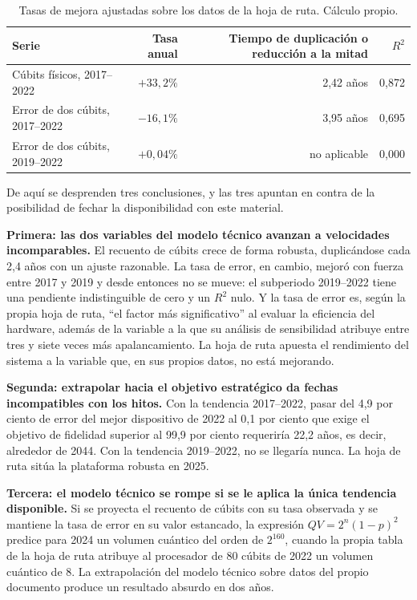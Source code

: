 \documentclass[11pt,letterpaper]{article}
\begin{document}
\begin{table}[ht]
  \centering
  \small
  \caption{Tasas de mejora ajustadas sobre los datos de la hoja de ruta.
  Cálculo propio.}
  \label{tab:tasas}
  \begin{tabularx}{\textwidth}{@{}>{\raggedright\arraybackslash}X rrr@{}}
    \toprule
    \textbf{Serie} & \textbf{Tasa anual} & \textbf{Tiempo de duplicación
    o reducción a la mitad} & \textbf{$R^{2}$} \\
    \midrule
    Cúbits físicos, 2017--2022 & $+33{,}2\%$ & 2,42 años & 0,872 \\
    Error de dos cúbits, 2017--2022 & $-16{,}1\%$ & 3,95 años & 0,695 \\
    Error de dos cúbits, 2019--2022 & $+0{,}04\%$ & no aplicable & 0,000 \\
    \bottomrule
  \end{tabularx}
\end{table}

De aquí se desprenden tres conclusiones, y las tres apuntan en contra de la
posibilidad de fechar la disponibilidad con este material.

\textbf{Primera: las dos variables del modelo técnico avanzan a velocidades
incomparables.} El recuento de cúbits crece de forma robusta, duplicándose cada
2,4 años con un ajuste razonable. La tasa de error, en cambio, mejoró con
fuerza entre 2017 y 2019 y desde entonces no se mueve: el subperiodo 2019--2022
tiene una pendiente indistinguible de cero y un $R^{2}$ nulo. Y la tasa de
error es, según la propia hoja de ruta, \enquote{el factor más significativo}
al evaluar la eficiencia del hardware, además de la variable a la que su
análisis de sensibilidad atribuye entre tres y siete veces más apalancamiento.
La hoja de ruta apuesta el rendimiento del sistema a la variable que, en sus
propios datos, no está mejorando.

\textbf{Segunda: extrapolar hacia el objetivo estratégico da fechas
incompatibles con los hitos.} Con la tendencia 2017--2022, pasar del 4,9 por
ciento de error del mejor dispositivo de 2022 al 0,1 por ciento que exige el
objetivo de fidelidad superior al 99,9 por ciento requeriría 22,2 años, es
decir, alrededor de 2044. Con la tendencia 2019--2022, no se llegaría nunca. La
hoja de ruta sitúa la plataforma robusta en 2025.

\textbf{Tercera: el modelo técnico se rompe si se le aplica la única tendencia
disponible.} Si se proyecta el recuento de cúbits con su tasa observada y se
mantiene la tasa de error en su valor estancado, la expresión
$QV = 2^{n}(1-p)^{2}$ predice para 2024 un volumen cuántico del orden de
$2^{160}$, cuando la propia tabla de la hoja de ruta atribuye al procesador de
80 cúbits de 2022 un volumen cuántico de 8. La extrapolación del modelo técnico
sobre datos del propio documento produce un resultado absurdo en dos años.
\end{document}

